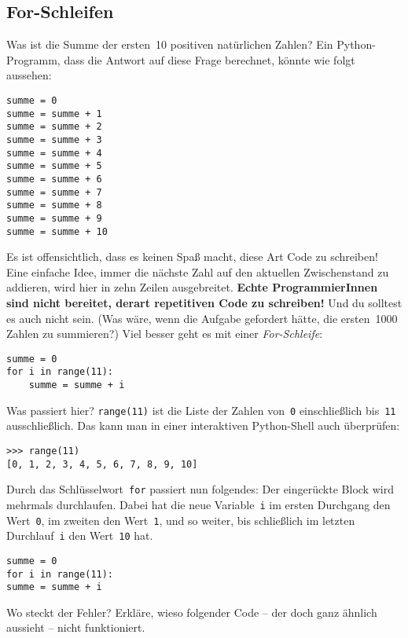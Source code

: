 \documentclass{blatt}
\begin{document}
\subsection{For-Schleifen}

Was ist die Summe der ersten~10 positiven natürlichen Zahlen? Ein
Python-Programm, dass die Antwort auf diese Frage berechnet, könnte wie folgt
aussehen:
\begin{verbatim}
summe = 0
summe = summe + 1
summe = summe + 2
summe = summe + 3
summe = summe + 4
summe = summe + 5
summe = summe + 6
summe = summe + 7
summe = summe + 8
summe = summe + 9
summe = summe + 10
\end{verbatim}
Es ist offensichtlich, dass es keinen Spaß macht, diese Art Code zu schreiben!
Eine einfache Idee, immer die nächste Zahl auf den aktuellen Zwischenstand zu
addieren, wird hier in zehn Zeilen ausgebreitet. \textbf{Echte ProgrammierInnen
sind nicht bereitet, derart repetitiven Code zu schreiben!} Und du solltest es
auch nicht sein. (Was wäre, wenn die Aufgabe gefordert hätte, die ersten~1000
Zahlen zu summieren?) Viel besser geht es mit einer \emph{For-Schleife}:
\begin{verbatim}
summe = 0
for i in range(11):
    summe = summe + i
\end{verbatim}
Was passiert hier? \texttt{range(11)} ist die Liste der Zahlen
von~\texttt{0} einschließlich bis~\texttt{11}
ausschließlich. Das kann man in einer interaktiven Python-Shell auch
überprüfen:
\begin{verbatim}
>>> range(11)
[0, 1, 2, 3, 4, 5, 6, 7, 8, 9, 10]
\end{verbatim}
Durch das Schlüsselwort~\texttt{for} passiert nun folgendes: Der
eingerückte Block wird mehrmals durchlaufen. Dabei hat die neue
Variable~\texttt{i} im ersten Durchgang den
Wert~\texttt{0}, im zweiten den Wert~\texttt{1}, und so
weiter, bis schließlich im letzten Durchlauf~\texttt{i} den
Wert~\texttt{10} hat.

\begin{lrbox}{\foobox}\begin{minipage}{\textwidth}\begin{verbatim}
summe = 0
for i in range(11):
summe = summe + i
\end{verbatim}
\end{minipage}\end{lrbox}
\begin{aufgabe}{Wo steckt der Fehler?}
Erkläre, wieso folgender Code -- der doch ganz ähnlich aussieht -- nicht
funktioniert.

\usebox{\foobox}
\end{aufgabe}
\end{document}
